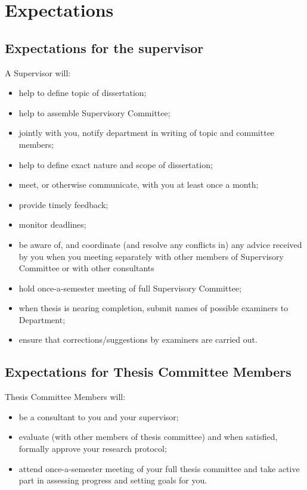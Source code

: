 \documentclass[
  letterpaper,
  DIV=11,
  numbers=noendperiod]{scrreprt}
\providecommand{\tightlist}{%
  \setlength{\itemsep}{0pt}\setlength{\parskip}{0pt}}
\begin{document}
\section{Expectations}\label{expectations}

\subsection{Expectations for the
supervisor}\label{expectations-for-the-supervisor}

A Supervisor will:

\begin{itemize}
\tightlist
\item
  help to define topic of dissertation;
\item
  help to assemble Supervisory Committee;
\item
  jointly with you, notify department in writing of topic and committee
  members;
\item
  help to define exact nature and scope of dissertation;
\item
  meet, or otherwise communicate, with you at least once a month;
\item
  provide timely feedback;
\item
  monitor deadlines;
\item
  be aware of, and coordinate (and resolve any conflicts in) any advice
  received by you when you meeting separately with other members of
  Supervisory Committee or with other consultants
\item
  hold once-a-semester meeting of full Supervisory Committee;
\item
  when thesis is nearing completion, submit names of possible examiners
  to Department;
\item
  ensure that corrections/suggestions by examiners are carried out.
\end{itemize}

\subsection{Expectations for Thesis Committee
Members}\label{expectations-for-thesis-committee-members}

Thesis Committee Members will:

\begin{itemize}
\tightlist
\item
  be a consultant to you and your supervisor;
\item
  evaluate (with other members of thesis committee) and when satisfied,
  formally approve your research protocol;
\item
  attend once-a-semester meeting of your full thesis committee and take
  active part in assessing progress and setting goals for you.
\end{itemize}
\end{document}
